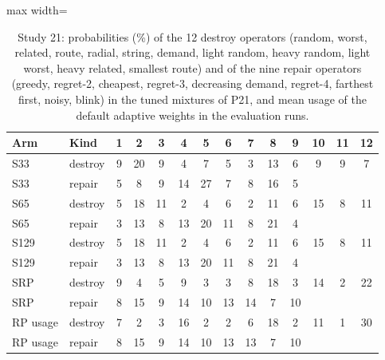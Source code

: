 \begin{table}[t]
\caption{Study 21: probabilities (\%) of the 12 destroy operators (random, worst, related, route, radial, string, demand, light random, heavy random, light worst, heavy related, smallest route) and of the nine repair operators (greedy, regret-2, cheapest, regret-3, decreasing demand, regret-4, farthest first, noisy, blink) in the tuned mixtures of P21, and mean usage of the default adaptive weights in the evaluation runs.}\label{tab:s21w}
\centering
\small
\begin{adjustbox}{max width=\linewidth}
\begin{tabular}{llcccccccccccc}
\toprule
Arm & Kind & 1 & 2 & 3 & 4 & 5 & 6 & 7 & 8 & 9 & 10 & 11 & 12 \\
\midrule
S33 & destroy & 9 & 20 & 9 & 4 & 7 & 5 & 3 & 13 & 6 & 9 & 9 & 7 \\
S33 & repair & 5 & 8 & 9 & 14 & 27 & 7 & 8 & 16 & 5 &  &  &  \\
S65 & destroy & 5 & 18 & 11 & 2 & 4 & 6 & 2 & 11 & 6 & 15 & 8 & 11 \\
S65 & repair & 3 & 13 & 8 & 13 & 20 & 11 & 8 & 21 & 4 &  &  &  \\
S129 & destroy & 5 & 18 & 11 & 2 & 4 & 6 & 2 & 11 & 6 & 15 & 8 & 11 \\
S129 & repair & 3 & 13 & 8 & 13 & 20 & 11 & 8 & 21 & 4 &  &  &  \\
SRP & destroy & 9 & 4 & 5 & 9 & 3 & 3 & 8 & 18 & 3 & 14 & 2 & 22 \\
SRP & repair & 8 & 15 & 9 & 14 & 10 & 13 & 14 & 7 & 10 &  &  &  \\
RP usage & destroy & 7 & 2 & 3 & 16 & 2 & 2 & 6 & 18 & 2 & 11 & 1 & 30 \\
RP usage & repair & 8 & 15 & 9 & 14 & 10 & 13 & 13 & 7 & 10 &  &  &  \\
\bottomrule
\end{tabular}
\end{adjustbox}
\end{table}
